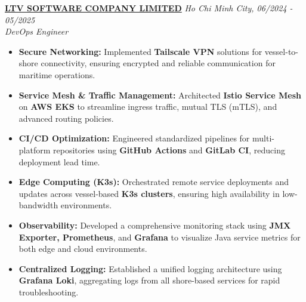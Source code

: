 \documentclass[a4paper,10pt]{article}
\begin{document}
\vspace{10pt}
\noindent \textbf{\href{https://www.linkedin.com/company/ltvofficial/posts/?feedView=all}{LTV SOFTWARE COMPANY LIMITED}} \hfill \textit{Ho Chi Minh City, 06/2024 - 05/2025}  \\
\textit{DevOps Engineer} \\
\begin{itemize}[leftmargin=*, itemsep=2pt]
    \item \textbf{Secure Networking:} Implemented \textbf{Tailscale VPN} solutions for vessel-to-shore connectivity, ensuring encrypted and reliable communication for maritime operations.
    \item \textbf{Service Mesh \& Traffic Management:} Architected \textbf{Istio Service Mesh} on \textbf{AWS EKS} to streamline ingress traffic, mutual TLS (mTLS), and advanced routing policies.
    \item \textbf{CI/CD Optimization:} Engineered standardized pipelines for multi-platform repositories using \textbf{GitHub Actions} and \textbf{GitLab CI}, reducing deployment lead time.
    \item \textbf{Edge Computing (K3s):} Orchestrated remote service deployments and updates across vessel-based \textbf{K3s clusters}, ensuring high availability in low-bandwidth environments.
    \item \textbf{Observability:} Developed a comprehensive monitoring stack using \textbf{JMX Exporter, Prometheus}, and \textbf{Grafana} to visualize Java service metrics for both edge and cloud environments.
    \item \textbf{Centralized Logging:} Established a unified logging architecture using \textbf{Grafana Loki}, aggregating logs from all shore-based services for rapid troubleshooting.
\end{itemize}
\end{document}
